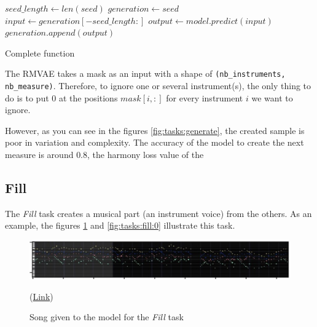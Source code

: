 \documentclass[12pt]{report}
\begin{document}
\begin{algorithm}
    \begin{algorithmic}[1]
        \Statex
            \State $seed\_length \gets len(seed)$
            \State $generation \gets seed$
                \State $input \gets generation[-seed\_length:]$
                \State $output \gets model.predict(input)$
                \State $generation.append(output)$
            \EndFor
            \State {}
        \EndFunction
        \end{algorithmic}
    \caption{Complete function}
    \label{alg:tasks:generate}
\end{algorithm}

The RMVAE takes a mask as an input with a shape of \texttt{(nb\_instruments, nb\_measure)}.
Therefore, to ignore one or several instrument(s), the only thing to do is to put $0$ at the positions $mask[i, :]$ for every instrument $i$ we want to ignore.

However, as you can see in the figures \ref{fig:tasks:generate}, the created sample is poor in variation and complexity.
The accuracy of the model to create the next measure is around $0.8$, the harmony loss value of the  

\subsection{Fill}
\label{sec:tasks:fill}

The \textit{Fill} task creates a musical part (an instrument voice) from the others.
As an example, the figures \ref{fig:tasks:fill:truth} and \ref{fig:tasks:fill:0} illustrate this task.

\begin{figure}[htbp]
    \centering
    \includegraphics[width=\textwidth]{images/generated_midis/tasks/fill/task-fill-truth.jpg}
    \caption{Song given to the model for the \textit{Fill} task}
    (\href{https://github.com/ValentinVignal/midiGenerator/blob/master/samples/tasks/fill_truth.mid}{Link})
    \label{fig:tasks:fill:truth}
\end{figure}
\end{document}
